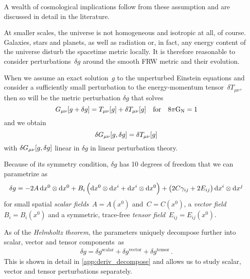 \documentclass[parskip=half]{scrreprt}
\newcommand{\todocheck}[1]{\todo[color=blue!40]{#1}}
\begin{document}
A wealth of cosmological implications follow from these assumption and are discussed in detail in the literature. 

At smaller scales, the universe is not homogeneous and isotropic at all, of course. Galaxies, stars and planets, as well as radiation or, in fact, any energy content of the universe disturb the spacetime metric locally. It is therefore reasonable to consider perturbations~\(\delta g\) around the smooth FRW metric and their evolution.

When we assume an exact solution~\(g\) to the unperturbed Einstein equations and consider a sufficiently small perturbation to the energy-momentum tensor~\(\delta T_{\mu \nu}\), then so will be the metric perturbation \(\delta g\)  that solves
\begin{equation}
	G_{\mu \nu}[g + \delta g] = T_{\mu \nu}[g] + \delta T_{\mu \nu}[g] \quad \textrm{for} \quad 8 \pi \mathrm{G}_\mathrm{N} = 1
\end{equation}
and we obtain
\begin{equation}\label{eq:perturbed_einstein_eqns}
	\delta G_{\mu \nu}[g,\delta g] = \delta T_{\mu \nu}[g]
\end{equation}
with \(\delta G_{\mu \nu}[g,\delta g]\) linear in \(\delta g\) in linear perturbation theory.

Because of its symmetry condition, \(\delta g\) has 10 degrees of freedom that we can parametrize as \citep{Schulz}
\begin{align}
	\delta g = -2A \dif{x^0}\otimes\dif{x^0} + B_i\del{\dif{x^0}\otimes\dif{x^i}+\dif{x^i}\otimes\dif{x^0}} + \del{2C\gamma_{ij} + 2E_{ij}}\dif{x^i}\otimes\dif{x^j}
\end{align}\todocheck{notation}
for small spatial \emph{scalar fields}~\(A=A(x^0)\) and~\(C=C(x^0)\), a \emph{vector field}~\(B_i=B_i(x^0)\) and a symmetric, trace-free \emph{tensor field}~\(E_{ij}=E_{ij}(x^0)\).

As of the \emph{Helmholtz theorem}, the parameters uniquely decompose further into scalar, vector and tensor components~as
\begin{align}
	\delta g = \delta g^{\mathrm{scalar}} + \delta g^{\mathrm{vector}} + \delta g^{\mathrm{tensor}} \, \textrm{.}
\end{align}
This is shown in detail in \autoref{app:deriv_decompose} and allows us to study scalar, vector and tensor perturbations separately. 
\end{document}

